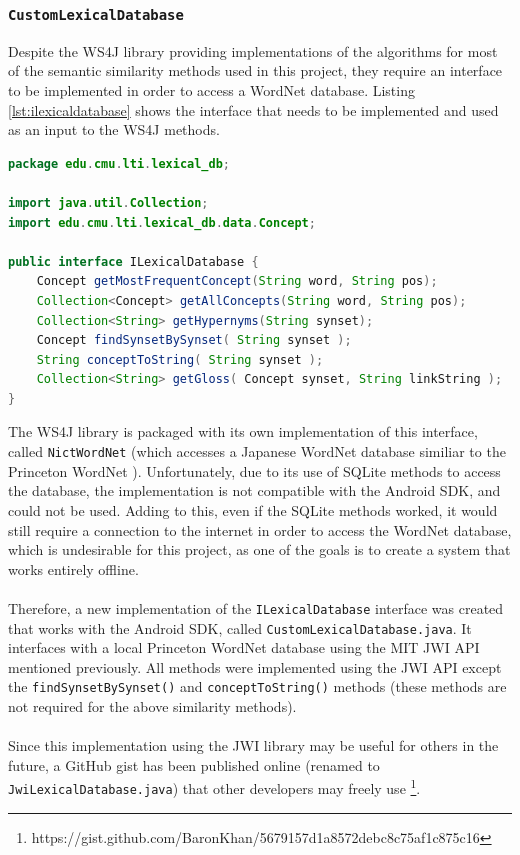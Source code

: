 \documentclass[11pt]{article}
\begin{document}
\subsubsection{\texttt{CustomLexicalDatabase}}
\label{custom-lexical-database-impl}

Despite the WS4J library providing implementations of the algorithms for most of the semantic similarity methods used in this project, they require an interface to be implemented in order to access a WordNet database. Listing \ref{lst:ilexicaldatabase} shows the interface that needs to be implemented and used as an input to the WS4J methods.

\begin{lstlisting}[language=Java, caption=ILexicalDatabase.java (from the WS4J library), label={lst:ilexicaldatabase}]
package edu.cmu.lti.lexical_db;

import java.util.Collection;
import edu.cmu.lti.lexical_db.data.Concept;

public interface ILexicalDatabase {
	Concept getMostFrequentConcept(String word, String pos);
	Collection<Concept> getAllConcepts(String word, String pos);
	Collection<String> getHypernyms(String synset);
	Concept findSynsetBySynset( String synset );
	String conceptToString( String synset );
	Collection<String> getGloss( Concept synset, String linkString );
}
\end{lstlisting}

The WS4J library is packaged with its own implementation of this interface, called \texttt{NictWordNet} (which accesses a Japanese WordNet database similiar to the Princeton WordNet \cite{RefWorks:122}). Unfortunately, due to its use of SQLite methods to access the database, the implementation is not compatible with the Android SDK, and could not be used. Adding to this, even if the SQLite methods worked, it would still require a connection to the internet in order to access the WordNet database, which is undesirable for this project, as one of the goals is to create a system that works entirely offline.
\\
\\
Therefore, a new implementation of the \texttt{ILexicalDatabase} interface was created that works with the Android SDK, called \texttt{CustomLexicalDatabase.java}. It interfaces with a local Princeton WordNet database using the MIT JWI API mentioned previously. All methods were implemented using the JWI API except the \texttt{findSynsetBySynset()} and \texttt{conceptToString()} methods (these methods are not required for the above similarity methods).
\\
\\
Since this implementation using the JWI library may be useful for others in the future, a GitHub gist has been published online (renamed to \texttt{JwiLexicalDatabase.java}) that other developers may freely use \footnote{https://gist.github.com/BaronKhan/5679157d1a8572debc8c75af1c875c16}.
\end{document}
